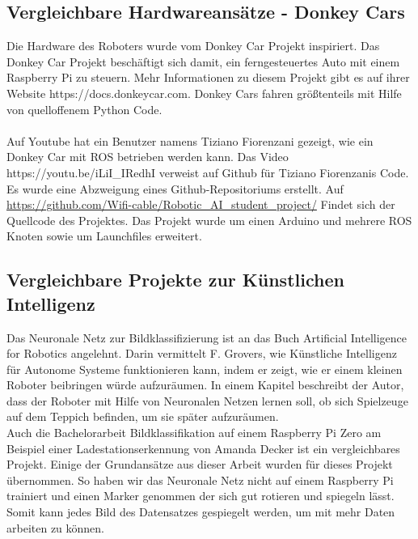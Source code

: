 \documentclass[conference]{IEEEtran}
\begin{document}
	\subsection{Vergleichbare Hardwareansätze - Donkey Cars} %
	Die Hardware des Roboters wurde vom Donkey Car Projekt inspiriert.
	Das Donkey Car Projekt beschäftigt sich damit, ein ferngesteuertes Auto mit einem Raspberry Pi zu steuern.
	Mehr Informationen zu diesem Projekt gibt es auf ihrer Website https://docs.donkeycar.com.
	Donkey Cars fahren größtenteils mit Hilfe von quelloffenem Python Code. \\
	\\
	Auf Youtube hat ein Benutzer namens Tiziano Fiorenzani gezeigt, wie ein Donkey Car mit ROS betrieben werden kann.
	Das Video https://youtu.be/iLiI\_IRedhI verweist auf Github für Tiziano 
	Fiorenzanis Code. Es wurde eine Abzweigung eines Github-Repositoriums 
	erstellt. Auf 
	\url{https://github.com/Wifi-cable/Robotic_AI_student_project/}
	Findet sich der Quellcode des Projektes. 
	Das Projekt wurde um einen Arduino und mehrere ROS Knoten sowie um 
	Launchfiles erweitert.
		
	\subsection{Vergleichbare Projekte zur Künstlichen Intelligenz} %
	Das Neuronale Netz zur Bildklassifizierung ist an das Buch \glqq Artificial Intelligence for Robotics\grqq  \cite{govers2018artificial} angelehnt.
	Darin vermittelt F. Grovers, wie Künstliche Intelligenz für Autonome Systeme funktionieren kann, indem er zeigt, wie er einem kleinen Roboter beibringen würde aufzuräumen.
	In einem Kapitel beschreibt der Autor, dass der Roboter mit Hilfe von Neuronalen Netzen lernen soll, ob sich Spielzeuge auf dem Teppich befinden, um sie später aufzuräumen.\\
	
	Auch die Bachelorarbeit \glqq Bildklassifikation auf einem Raspberry Pi Zero am Beispiel einer Ladestationserkennung \grqq \cite{Amanda} von Amanda Decker ist ein vergleichbares Projekt.
	Einige der Grundansätze aus dieser Arbeit wurden für dieses Projekt übernommen.
	So haben wir das Neuronale Netz nicht auf einem Raspberry Pi trainiert und einen Marker genommen der sich gut rotieren und spiegeln lässt.
	Somit kann jedes Bild des Datensatzes gespiegelt werden, um mit mehr Daten arbeiten zu können.
	
\end{document}
